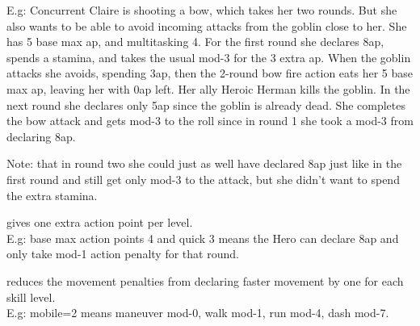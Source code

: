 E.g: Concurrent Claire is shooting a bow, which takes her two rounds. But she also wants to be able to avoid incoming attacks from the goblin close to her. She has 5 base max ap, and multitasking 4. For the first round she declares 8ap, spends a stamina, and takes the usual mod-3 for the 3 extra ap. When the goblin attacks she avoids, spending 3ap, then the 2-round bow fire action eats her 5 base max ap, leaving her with 0ap left. Her ally Heroic Herman kills the goblin. In the next round she declares only 5ap since the goblin is already dead. She completes the bow attack and gets mod-3 to the roll since in round 1 she took a mod-3 from declaring 8ap.

Note: that in round two she could just as well have declared 8ap just like in the first round and still get only mod-3 to the attack, but she didn't want to spend the extra stamina.


%
%
%
%



 gives one extra action point per level. \\
E.g: base max action points 4 and quick 3 means the Hero can declare 8ap and only take mod-1 action penalty for that round.


 reduces the movement penalties from declaring faster movement by one for each skill level. \\
E.g: mobile=2 means maneuver mod-0, walk mod-1, run mod-4, dash mod-7.


